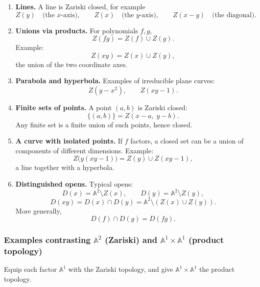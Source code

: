 \documentclass[12pt,a4paper]{article}
\theoremstyle{plain}
\theoremstyle{definition}      %
\begin{document}
\begin{enumerate}
	\item \textbf{Lines.}
	A line is Zariski closed, for example
	\[
	Z(y)
	\quad
	\text{(the $x$-axis)},
	\qquad
	Z(x)
	\quad
	\text{(the $y$-axis)},
	\qquad
	Z(x-y)
	\quad
	\text{(the diagonal)}.
	\]
	
	\item \textbf{Unions via products.}
	For polynomials $f,g$,
	\[
	Z(fg)
	=
	Z(f)\cup Z(g).
	\]
	Example:
	\[
	Z(xy)
	=
	Z(x)\cup Z(y),
	\]
	the union of the two coordinate axes.
	
	\item \textbf{Parabola and hyperbola.}
	Examples of irreducible plane curves:
	\[
	Z(y-x^2),
	\qquad
	Z(xy-1).
	\]
	
	\item \textbf{Finite sets of points.}
	A point $(a,b)$ is Zariski closed:
	\[
	\{(a,b)\}
	=
	Z(x-a,\;y-b).
	\]
	Any finite set is a finite union of such points, hence closed.
	
	\item \textbf{A curve with isolated points.}
	If $f$ factors, a closed set can be a union of components of different dimensions.
	Example:
	\[
	Z\bigl(y(xy-1)\bigr)
	=
	Z(y)\cup Z(xy-1),
	\]
	a line together with a hyperbola.
	
	\item \textbf{Distinguished opens.}
	Typical opens:
	\[
	D(x)
	=
	\mathbb A^2\setminus Z(x),
	\qquad
	D(y)
	=
	\mathbb A^2\setminus Z(y),
	\]
	\[
	D(xy)
	=
	D(x)\cap D(y)
	=
	\mathbb A^2\setminus (Z(x)\cup Z(y)).
	\]
	More generally,
	\[
	D(f)\cap D(g)=D(fg).
	\]
\end{enumerate}

\subsubsection*{Examples contrasting $\mathbb A^2$ (Zariski) and $\mathbb A^1\times \mathbb A^1$ (product topology)}

Equip each factor $\mathbb A^1$ with the Zariski topology, and give $\mathbb A^1\times \mathbb A^1$ the product topology.
\end{document}
